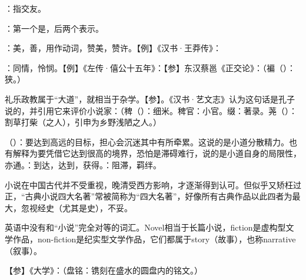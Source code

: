 {
\item {}：指交友。
\item {}：第一个是，后两个表示。
\item {}：美，善，用作动词，赞美，赞许。【例】《汉书·王莽传》：

：同情，怜悯。【例】《左传·僖公十五年》：【参】东汉蔡邕《正交论》：（褊（）：狭。）
}
{}


{
\item 礼乐政教属于“大道”，就相当于杂学。【参】。《汉书·艺文志》认为这句话是孔子说的，并引用它来评价小说家：（稗（）：细米。稗官：小官。缀：著录。荛（）：割草打柴（之人），引申为乡野浅陋之人。）

\item {}（）：要达到高远的目标，担心会沉迷其中有所牵累。这说的是小道分散精力。也有解释为要凭借它达到很高的境界，恐怕是滞碍难行，说的是小道自身的局限性，亦通。：到达，达到，获得。：阻滞，羁绊。
}
{
小说在中国古代并不受重视，晚清受西方影响，才逐渐得到认可。但似乎又矫枉过正，“古典小说四大名著”常被简称为“四大名著”，好像所有古典作品以此四者为最大，忽视经史（尤其是史），不妥。

英语中没有和“小说”完全对等的词汇。Novel相当于长篇小说，fiction是虚构型文学作品，non-fiction是纪实型文学作品，它们都属于story（故事），也称narrative（叙事）。
}


{
【参】《大学》：（盘铭：镌刻在盛水的圆盘内的铭文。）
}
{}  %



